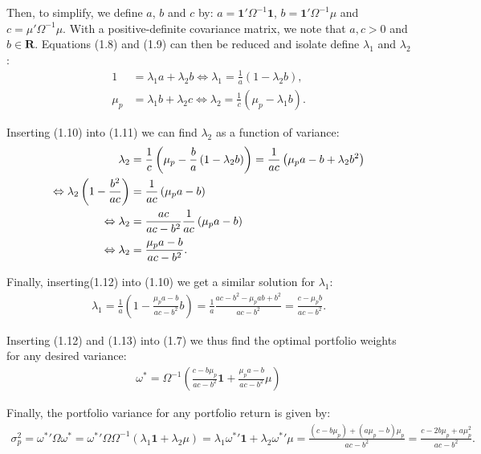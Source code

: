 \documentclass[11pt,a4paper,oneside]{article}
\newcommand{\LL}{\Leftrightarrow}
\newcommand{\lp}{\left(}
\newcommand{\rp}{\right)}
\newcommand{\rr}{\mathbf{R}}
\begin{document}
Then, to simplify, we define $a$, $b$ and $c$ by: $a = \mathbf{1}'\Omega^{-1} \mathbf{1}$, $b = \mathbf{1}'\Omega^{-1}\mu$ and $c = \mu'\Omega^{-1}\mu$. With a positive-definite covariance matrix, we note that $a, c > 0$ and $b \in \rr$. Equations (1.8) and (1.9) can then be reduced and isolate define $\lambda_1$ and $\lambda_2$:
\begin{align}
    1 &= \lambda_1 a + \lambda_2 b 
    \LL 
    \lambda_1  = \frac{1}{a}\lp 1 - \lambda_2 b\rp, \\
    \mu_p &= \lambda_1 b + \lambda_2 c
    \LL 
    \lambda_2 = \frac{1}{c}\lp \mu_p - \lambda_1 b\rp.
\end{align}

Inserting (1.10) into (1.11) we can find $\lambda_2$ as a function of variance:
\begin{align}
    \lambda_2 
        &= \frac{1}{c} \lp \mu_p - \frac{b}{a}\lp 1 - \lambda_2 b\rp\rp \notag 
         = \frac{1}{ac}\lp \mu_p a - b + \lambda_2 b^2 \rp \notag \\
    \LL \lambda_2 \lp 1 - \frac{b^2}{ac}\rp
        &= \frac{1}{ac}\lp \mu_p a - b\rp \notag \\
    \LL \lambda_2 
        &= \frac{ac}{ac - b^2}\frac{1}{ac}\lp \mu_p a - b\rp \notag \\
    \LL \lambda_2
        &= \frac{\mu_p a - b}{ac - b^2}.
\end{align}

Finally, inserting(1.12) into (1.10) we get a similar solution for $\lambda_1$:
\begin{align}
    \lambda_1
        = \frac{1}{a}\lp 1 - \frac{\mu_p a - b}{ac - b^2} b\rp = \frac{1}{a}\frac{ac - b^2 - \mu_p a b + b^2}{ac - b^2} = \frac{c - \mu_p b}{ac - b^2}.
\end{align}

Inserting (1.12) and (1.13) into (1.7) we thus find the optimal portfolio weights for any desired variance:
\begin{align}
    \omega^* = \Omega^{-1}\lp \frac{c - b \mu_p}{ac - b^2} \mathbf{1} + \frac{\mu_p a - b}{ac - b^2} \mu\rp
\end{align}

Finally, the portfolio variance for any portfolio return is given by:
\begin{align}
    \sigma_p^2 = {\omega^*}'\Omega\omega^* = {\omega^*}' \Omega \Omega^{-1}\lp \lambda_1 \mathbf{1} + \lambda_2 \mu \rp = \lambda_1 {\omega^*}'\mathbf{1} + \lambda_2 {\omega^*}'\mu = \frac{\lp c - b \mu_p\rp + \lp a \mu_p - b\rp \mu_p}{ac - b^2} = \frac{c - 2b \mu_p + a \mu_p^2}{ac - b^2}.
\end{align}
\end{document}
